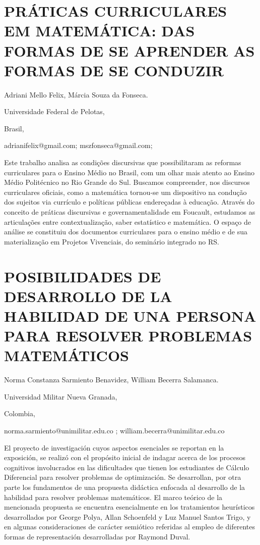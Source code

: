 \section{PRÁTICAS CURRICULARES EM MATEMÁTICA: DAS FORMAS DE SE APRENDER AS
FORMAS DE SE CONDUZIR}

\begin{datos}

Adriani Mello Felix, Márcia Souza da Fonseca.

Universidade Federal de Pelotas,

Brasil,

adrianifelix@gmail.com; mszfonseca@gmail.com; 

\end{datos}

Este trabalho analisa as condições discursivas que possibilitaram
as reformas curriculares para o Ensino Médio no Brasil, com um olhar
mais atento ao Ensino Médio Politécnico no Rio Grande do Sul. Buscamos
compreender, nos discursos curriculares oficiais, como a matemática
tornou-se um dispositivo na condução dos sujeitos via currículo e
políticas públicas endereçadas à educação. Através do conceito de
práticas discursivas e governamentalidade em Foucault, estudamos as
articulações entre contextualização, saber estatístico e matemática.
O espaço de análise se constituiu dos documentos curriculares para
o ensino médio e de sua materialização em Projetos Vivenciais, do
seminário integrado no RS. 


\section{POSIBILIDADES DE DESARROLLO DE LA HABILIDAD DE UNA PERSONA PARA RESOLVER
PROBLEMAS MATEMÁTICOS}

\begin{datos}

Norma Constanza Sarmiento Benavidez, William Becerra Salamanca.

Universidad Militar Nueva Granada,

Colombia,

norma.sarmiento@unimilitar.edu.co ; william.becerra@unimilitar.edu.co

\end{datos}

El proyecto de investigación cuyos aspectos esenciales se reportan
en la exposición, se realizó con el propósito inicial de indagar acerca
de los procesos cognitivos involucrados en las dificultades que tienen
los estudiantes de Cálculo Diferencial para resolver problemas de
optimización. Se desarrollan, por otra parte los fundamentos de una
propuesta didáctica enfocada al desarrollo de la habilidad para resolver
problemas matemáticos. El marco teórico de la mencionada propuesta
se encuentra esencialmente en los tratamientos heurísticos desarrollados
por George Polya, Allan Schoenfeld y Luz Manuel Santos Trigo, y en
algunas consideraciones de carácter semiótico referidas al empleo
de diferentes formas de representación desarrolladas por Raymond Duval.


